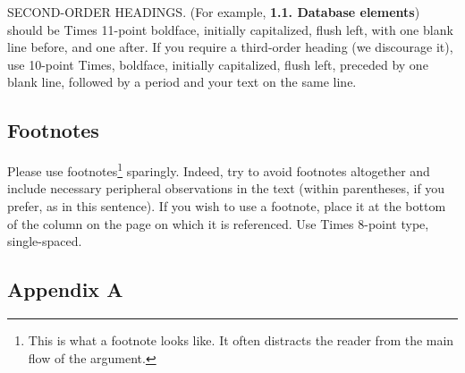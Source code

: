 \documentclass[10pt,twocolumn,letterpaper]{article}
\begin{document}
SECOND-ORDER HEADINGS. (For example, { \bf 1.1. Database elements})
should be Times 11-point boldface, initially capitalized, flush left,
with one blank line before, and one after. If you require a third-order
heading (we discourage it), use 10-point Times, boldface, initially
capitalized, flush left, preceded by one blank line, followed by a period
and your text on the same line.

\subsection{Footnotes}

Please use footnotes\footnote {This is what a footnote looks like.  It
often distracts the reader from the main flow of the argument.} sparingly.
Indeed, try to avoid footnotes altogether and include necessary peripheral
observations in
the text (within parentheses, if you prefer, as in this sentence).  If you
wish to use a footnote, place it at the bottom of the column on the page on
which it is referenced. Use Times 8-point type, single-spaced.

\subsection{Appendix A}
\end{document}

